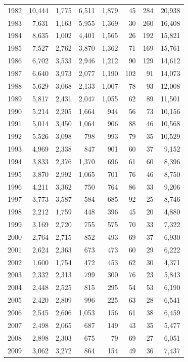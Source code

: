 \documentclass[
  english,
]{article}
\begin{document}
\begin{longtable}[t]{lrrrrrrr}
1982 & 10,444 & 1,775 & 6,511 & 1,879 & 45 & 284 & 20,938\\
1983 & 7,631 & 1,163 & 5,955 & 1,369 & 30 & 260 & 16,408\\
1984 & 8,635 & 1,002 & 4,401 & 1,565 & 26 & 192 & 15,821\\
1985 & 7,527 & 2,762 & 3,870 & 1,362 & 71 & 169 & 15,761\\
1986 & 6,702 & 3,533 & 2,946 & 1,212 & 90 & 129 & 14,612\\
1987 & 6,640 & 3,973 & 2,077 & 1,190 & 102 & 91 & 14,073\\
1988 & 5,629 & 3,068 & 2,133 & 1,007 & 78 & 93 & 12,008\\
1989 & 5,817 & 2,431 & 2,047 & 1,055 & 62 & 89 & 11,501\\
1990 & 5,214 & 2,205 & 1,664 & 944 & 56 & 73 & 10,156\\
1991 & 5,014 & 3,450 & 1,064 & 906 & 88 & 46 & 10,568\\
1992 & 5,526 & 3,098 & 798 & 993 & 79 & 35 & 10,529\\
1993 & 4,969 & 2,338 & 847 & 901 & 60 & 37 & 9,152\\
1994 & 3,833 & 2,376 & 1,370 & 696 & 61 & 60 & 8,396\\
1995 & 3,870 & 2,992 & 1,065 & 701 & 76 & 46 & 8,750\\
1996 & 4,211 & 3,362 & 750 & 764 & 86 & 33 & 9,206\\
1997 & 3,773 & 3,587 & 584 & 685 & 92 & 25 & 8,746\\
1998 & 2,212 & 1,759 & 448 & 396 & 45 & 20 & 4,880\\
1999 & 3,169 & 2,720 & 755 & 575 & 70 & 33 & 7,322\\
2000 & 2,764 & 2,715 & 852 & 493 & 69 & 37 & 6,930\\
2001 & 2,624 & 2,363 & 673 & 473 & 60 & 29 & 6,222\\
2002 & 1,600 & 1,754 & 472 & 453 & 62 & 30 & 4,371\\
2003 & 2,332 & 2,313 & 799 & 300 & 76 & 23 & 5,843\\
2004 & 2,448 & 2,525 & 815 & 295 & 54 & 53 & 6,190\\
2005 & 2,420 & 2,809 & 996 & 225 & 63 & 28 & 6,541\\
2006 & 2,545 & 2,606 & 1,053 & 156 & 61 & 38 & 6,459\\
2007 & 2,498 & 2,065 & 687 & 149 & 43 & 35 & 5,477\\
2008 & 2,898 & 2,303 & 675 & 79 & 69 & 27 & 6,051\\
2009 & 3,062 & 3,272 & 864 & 154 & 49 & 36 & 7,437\\

\end{longtable}
\end{document}
